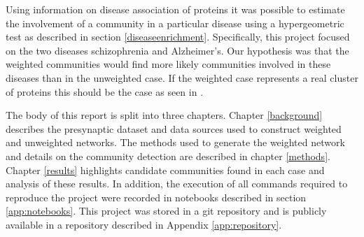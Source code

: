 Using information on disease association of proteins it was possible to estimate the involvement of a community in a particular disease using a hypergeometric test as described in section \ref{diseaseenrichment}.
Specifically, this project focused on the two diseases schizophrenia and Alzheimer's.
Our hypothesis was that the weighted communities would find more likely communities involved in these diseases than in the unweighted case.
If the weighted case represents a real cluster of proteins this should be the case as seen in \textcite{soler-lopez_interactome_2011}.

The body of this report is split into three chapters.
Chapter \ref{background} describes the presynaptic dataset and data sources used to construct weighted and unweighted networks.
The methods used to generate the weighted network and details on the community detection are described in chapter \ref{methods}.
Chapter \ref{results} highlights candidate communities found in each case and analysis of these results.
In addition, the execution of all commands required to reproduce the project were recorded in notebooks described in section \ref{app:notebooks}.
This project was stored in a git repository and is publicly available in a repository described in Appendix \ref{app:repository}.


